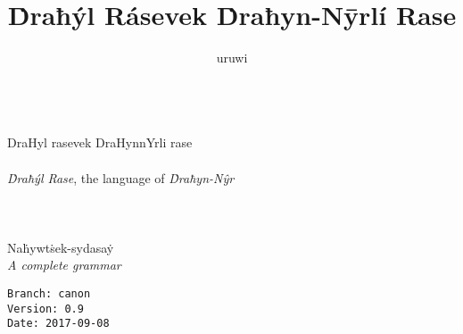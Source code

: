 \documentclass{book}
\title{Ḋraħýl Rásevek Ḋraħyn-Nȳrlí Rase}
\author{uruwi}
\begin{document}
\pagecolor{SkyBlue!25}

\begin{titlepage}
    \makeatletter
    \begin{center}
        {\color{Aquamarine} \hprule \vspace{1.5ex} \\}
        {\Huge \dhrfont \textcolor{Cerulean}{DraHyl rasevek DraHynnYrli rase}\\}
        {\large \sffamily \textcolor{RoyalBlue}{\@title} \\}
        {\large \textit{Ḋraħýl Rase}, the language of \textit{Ḋraħyn-Nŷr} \\}
        {\color{Aquamarine} \hprule \vspace{1.5ex} \\}
        \vspace{1.5cm}
        {\Large\bfseries \@author}\\[5pt]
        \vspace{2cm}
         \\
        {Naḣywtṡek-sydasaẏ} \\[5pt]
        \emph{A complete grammar}\\[2cm]
        \vfill
        \vfill
        {\@date}
    \end{center}
    \makeatother
\end{titlepage}

\pagecolor{SkyBlue!15}

\begin{verbatim}
Branch: canon
Version: 0.9
Date: 2017-09-08
\end{verbatim}
\end{document}
